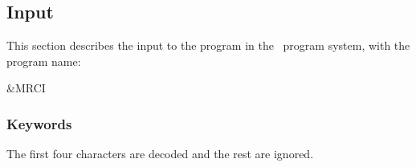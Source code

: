 \subsection{Input}
\label{UG:sec:gugaci_input}
This section describes the input to the
 program in the \molcas\ program system, with
the program name:
\begin{inputlisting}
 &MRCI
\end{inputlisting}

\subsubsection{Keywords}

The first four characters are decoded and the rest are ignored.

